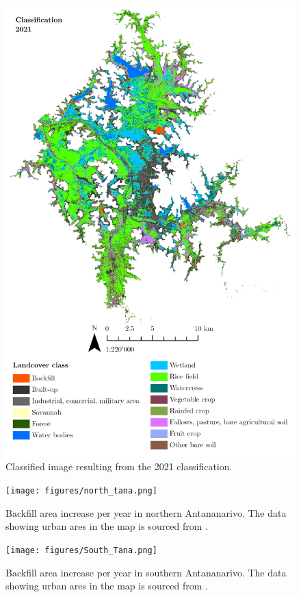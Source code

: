 \begin{figure}[H]
    \centering
    \includegraphics[width = 15cm]{figures/classi2021.png}
    \caption{Classified image resulting from the 2021 classification.}
    \label{}
\end{figure}






\begin{rotatepage}
\begin{landscape}
\begin{figure}[H]
\texttt{[image: figures/north\_tana.png]}
\caption{Backfill area increase per year in northern Antananarivo. The data showing urban ares in the map is sourced from \citet{Dupuy.2019}.}
\label{}
\end{figure}
\end{landscape}
\end{rotatepage}


\begin{rotatepage}
\begin{landscape}
\begin{figure}[H]
\texttt{[image: figures/South\_Tana.png]}
\caption{Backfill area increase per year in southern Antananarivo. The data showing urban ares in the map is sourced from \citet{Dupuy.2019}.}
\label{}
\end{figure}
\end{landscape}
\end{rotatepage}